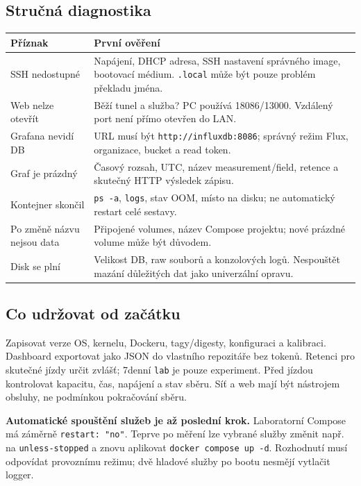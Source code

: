 \documentclass[11pt,a4paper]{article}
\begin{document}
\subsection{Stručná diagnostika}
\par\noindent\begin{tabularx}{\textwidth}{L{40mm}Y}
\toprule Příznak & První ověření\\\midrule
SSH nedostupné & Napájení, DHCP adresa, SSH nastavení správného image, bootovací médium. \texttt{.local} může být pouze problém překladu jména.\\\addlinespace
Web nelze otevřít & Běží tunel a služba? PC používá 18086/13000. Vzdálený port není přímo otevřen do LAN.\\\addlinespace
Grafana nevidí DB & URL musí být \texttt{http://influxdb:8086}; správný režim Flux, organizace, bucket a read token.\\\addlinespace
Graf je prázdný & Časový rozsah, UTC, název measurement/field, retence a skutečný HTTP výsledek zápisu.\\\addlinespace
Kontejner skončil & \texttt{ps -a}, \texttt{logs}, stav OOM, místo na disku; ne automatický restart celé sestavy.\\\addlinespace
Po změně názvu nejsou data & Připojené volumes, název Compose projektu; nové prázdné volume může být důvodem.\\\addlinespace
Disk se plní & Velikost DB, raw souborů a konzolových logů. Nespouštět mazání důležitých dat jako univerzální opravu.\\
\bottomrule\end{tabularx}\par

\subsection{Co udržovat od začátku}
Zapisovat verze OS, kernelu, Dockeru, tagy/digesty, konfiguraci a kalibraci. Dashboard exportovat jako JSON do vlastního repozitáře bez tokenů. Retenci pro skutečné jízdy určit zvlášť; 7denní \texttt{lab} je pouze experiment. Před jízdou kontrolovat kapacitu, čas, napájení a stav sběru. Síť a web mají být nástrojem obsluhy, ne podmínkou pokračování sběru.

\textbf{Automatické spouštění služeb je až poslední krok.} Laboratorní Compose má záměrně \texttt{restart: "no"}. Teprve po měření lze vybrané služby změnit např. na \texttt{unless-stopped} a znovu aplikovat \texttt{docker compose up -d}. Rozhodnutí musí odpovídat provoznímu režimu; dvě hladové služby po bootu nesmějí vytlačit logger.
\end{document}
